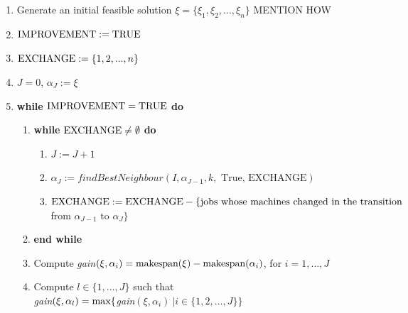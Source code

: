 \documentclass[12pt,a4paper,reqno]{article}
\begin{document}
\begin{enumerate}
\item Generate an initial feasible solution $\xi = \{\xi_1,\xi_2,...,\xi_n\}$ \color{red} MENTION HOW \color{black}
\item $\textnormal{IMPROVEMENT} := \textnormal{TRUE}$
\item[] $\textnormal{EXCHANGE} := \{1,2,...,n\}$
\item[] $J=0$, $\alpha_J := \xi$
\item \textbf{while} $\textnormal{IMPROVEMENT} = \textnormal{TRUE}$ \textbf{do}
\begin{enumerate}
\item \textbf{while} $\textnormal{EXCHANGE} \neq \emptyset$ \textbf{do}
\begin{enumerate}
\item $J := J+1$
\item $\alpha_J := findBestNeighbour(I,\alpha_{J-1},k,\text{ True, EXCHANGE})$
\item $\textnormal{EXCHANGE} := \textnormal{EXCHANGE} - \{\text{jobs whose machines changed in the transition}$\\
\hspace*{6cm} from $\alpha_{J-1} \text{ to } \alpha_{J}\} $
\end{enumerate}
\item[] \textbf{end while}
\item Compute \textit{gain}$(\xi,\alpha_i) = \textnormal{makespan}(\xi) - \textnormal{makespan}(\alpha_i)$, for $i=1,...,J$
\item Compute $l \in \{1,...,J\}$ such that \\ \textit{gain}$(\xi,\alpha_l) = \textnormal{max}\{$\textit{gain}$(\xi,\alpha_i) \> | i \in \{1,2,...,J\} \}$

\end{enumerate}
\end{enumerate}
\end{document}
